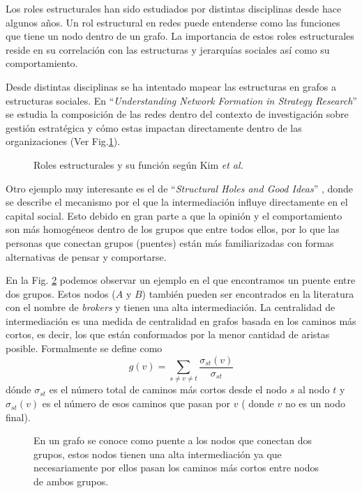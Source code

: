 Los roles estructurales han sido estudiados por distintas disciplinas desde hace algunos años. Un rol estructural en redes puede entenderse como las funciones que tiene un nodo dentro de un grafo. La importancia de estos roles estructurales reside en su correlación con las estructuras y jerarquías sociales así como su comportamiento. 

Desde distintas disciplinas se ha intentado mapear las estructuras en grafos a estructuras sociales. En \enquote{\textit{Understanding Network Formation in Strategy Research}} \cite{rose_kim_understanding_2016} se estudia la composición de las redes dentro del contexto de investigación sobre gestión estratégica y cómo estas impactan directamente dentro de las organizaciones (Ver Fig.\ref{fig:rosekim}).

 \begin{figure}[htbp]
   \centering
   
    \caption{Roles estructurales y su función según Kim \textit{et al.} \cite{rose_kim_understanding_2016}} %
    \label{fig:rosekim}
\end{figure}

Otro ejemplo muy interesante es el de \enquote{\textit{Structural Holes and Good Ideas}} \cite{burt_structural_2004}, donde se describe el mecanismo por el que la intermediación influye directamente en el capital social. Esto debido en gran parte a que la opinión y el comportamiento son más homogéneos dentro de los grupos que entre todos ellos, por lo que las personas que conectan grupos (puentes) están más familiarizadas con formas alternativas de pensar y comportarse. 

En la Fig. \ref{fig:broker} podemos observar un ejemplo en el que encontramos un puente entre dos grupos.  Estos nodos ($A$ y $B$) también pueden ser encontrados en la literatura con el nombre de \textit{brokers} y tienen una alta intermediación. La centralidad de intermediación es una medida de centralidad en grafos basada en los caminos más cortos, es decir, los que están conformados por la menor cantidad de aristas posible. Formalmente se define como $$g(v)=\sum _{{s\neq v\neq t}}{\frac{\sigma _{{st}}(v)}{\sigma _{{st}}}}$$ dónde $\sigma_{st}$ es el número total de caminos más cortos desde el nodo $s$ al nodo $t$ y
$\sigma_{st}(v)$ es el número de esos caminos que pasan por $v$ ( donde $v$ no es un nodo final).

 \begin{figure}[htbp]
   \centering
   
    \caption{En un grafo se conoce como puente a los nodos que conectan dos grupos, estos nodos tienen una alta intermediación ya que necesariamente por ellos pasan los caminos más cortos entre nodos de ambos grupos.}
    \label{fig:broker}
\end{figure}

